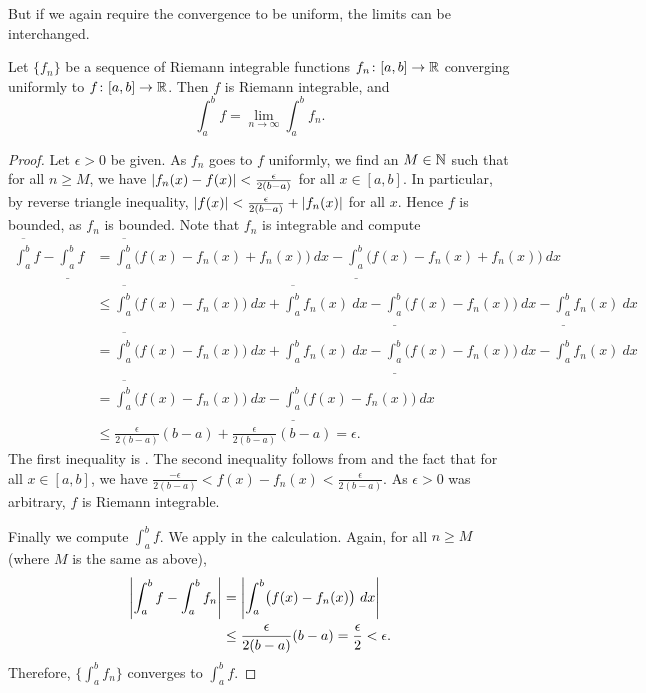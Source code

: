 But
if we again require the convergence to be uniform, the limits can
be interchanged.

\begin{thm} \label{integralinterchange:thm}
Let $\{ f_n \}$ be a sequence of Riemann integrable
functions
$f_n \colon [a,b] \to {\mathbb{R}}$
converging uniformly to $f \colon [a,b]
\to {\mathbb{R}}$.  Then $f$ is Riemann integrable, and
\begin{equation*}
\int_a^b f = \lim_{n\to\infty} \int_a^b f_n .
\end{equation*}
\end{thm}

\begin{proof}
Let $\epsilon > 0$ be given.
As $f_n$ goes to $f$ uniformly, we find an $M \in {\mathbb{N}}$ such that
for all $n \geq M$, we have 
$\left\lvert {f_n(x)-f(x)} \right\rvert < \frac{\epsilon}{2(b-a)}$ for all $x \in [a,b]$.
In particular, by reverse triangle inequality,
$\left\lvert {f(x)} \right\rvert < \frac{\epsilon}{2(b-a)} + \left\lvert {f_n(x)} \right\rvert$ for all $x$.
Hence $f$ is bounded,
as $f_n$ is bounded.
Note that $f_n$ is integrable and compute
\begin{equation*}
\begin{split}
\overline{\int_a^b} f
-
\underline{\int_a^b} f
& =
\overline{\int_a^b} \bigl( f(x) - f_n(x) + f_n(x) \bigr)~dx
-
\underline{\int_a^b} \bigl( f(x) - f_n(x) + f_n(x) \bigr)~dx
\\
& \leq
\overline{\int_a^b} \bigl( f(x) - f_n(x) \bigr)~dx +  \overline{\int_a^b} f_n(x) ~dx
-
\underline{\int_a^b} \bigl( f(x) - f_n(x) \bigr)~dx -  \underline{\int_a^b} f_n(x) ~dx
\\
& =
\overline{\int_a^b} \bigl( f(x) - f_n(x) \bigr)~dx +  \int_a^b f_n(x) ~dx
-
\underline{\int_a^b} \bigl( f(x) - f_n(x) \bigr)~dx -  \int_a^b f_n(x) ~dx
\\
& =
\overline{\int_a^b} \bigl( f(x) - f_n(x) \bigr)~dx
-
\underline{\int_a^b} \bigl( f(x) - f_n(x) \bigr)~dx
\\
& \leq
\frac{\epsilon}{2(b-a)} (b-a) + 
\frac{\epsilon}{2(b-a)} (b-a) = \epsilon .
\end{split}
\end{equation*}
The first inequality is .
The second inequality follows from  and 
the fact that for all $x \in [a,b]$, we have
$\frac{-\epsilon}{2(b-a)} < f(x)-f_n(x) < \frac{\epsilon}{2(b-a)}$.
As $\epsilon > 0$ was arbitrary, $f$ is Riemann integrable.

Finally we compute $\int_a^b f$.  We apply 
in the calculation.  Again, for all $n \geq M$ (where $M$ is the same as above),
\begin{equation*}
\begin{split}
\left\lvert {\int_a^b f - \int_a^b f_n} \right\rvert & = 
\left\lvert { \int_a^b \bigl(f(x) - f_n(x)\bigr)~dx} \right\rvert
\\
& \leq
\frac{\epsilon}{2(b-a)} (b-a) = \frac{\epsilon}{2} < \epsilon .
\end{split}
\end{equation*}
Therefore, $\{ \int_a^b f_n \}$ converges to $\int_a^b f$.
\end{proof}

